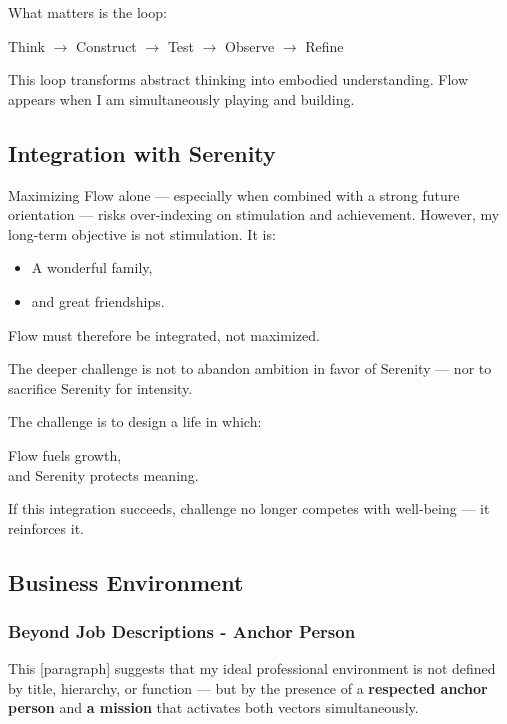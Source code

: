  What matters is the loop:
 
 \begin{center}
 	Think $\rightarrow$ Construct $\rightarrow$ Test $\rightarrow$ Observe $\rightarrow$ Refine
 \end{center}
 
 This loop transforms abstract thinking into embodied understanding.  
 Flow appears when I am simultaneously playing and building.
 
 \subsection{Integration with Serenity}
 
 Maximizing Flow alone — especially when combined with a strong future orientation — risks over-indexing on stimulation and achievement. However, my long-term objective is not stimulation. It is:
 \begin{itemize}
 	\item A wonderful family,
 	\item and great friendships.
 \end{itemize}
 
 Flow must therefore be integrated, not maximized.
 
 The deeper challenge is not to abandon ambition in favor of Serenity — nor to sacrifice Serenity for intensity.
 
 The challenge is to design a life in which:
 
 \begin{center}
 	Flow fuels growth, \\
 	and Serenity protects meaning.
 \end{center}
 
 If this integration succeeds, challenge no longer competes with well-being — it reinforces it.
 
 
 \subsection{Business Environment}
 
 \subsubsection{Beyond Job Descriptions - Anchor Person}
 \begin{center}
 	This [paragraph] suggests that my ideal professional environment is not defined by title, hierarchy, or function — but by the presence of a \textbf{respected anchor person} and \textbf{a mission} that activates both vectors simultaneously.
 \end{center}
 
